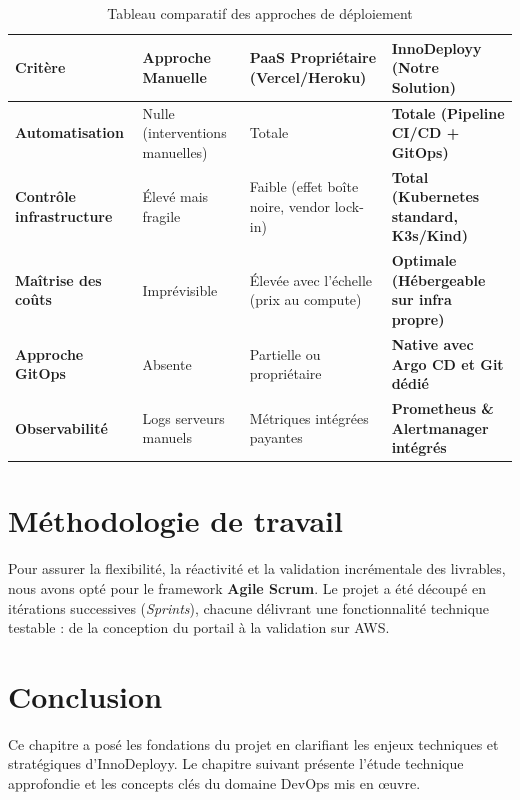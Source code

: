\documentclass[12pt,a4paper,oneside]{report}
\begin{document}
\begin{table}[H]
\centering
\small
\begin{tabularx}{\textwidth}{l X X X}
\toprule
\textbf{Critère} & \textbf{Approche Manuelle} & \textbf{PaaS Propriétaire (Vercel/Heroku)} & \textbf{InnoDeployy (Notre Solution)} \\
\midrule
\textbf{Automatisation} & Nulle (interventions manuelles) & Totale & \textbf{Totale (Pipeline CI/CD + GitOps)} \\
\textbf{Contrôle infrastructure} & Élevé mais fragile & Faible (effet boîte noire, vendor lock-in) & \textbf{Total (Kubernetes standard, K3s/Kind)} \\
\textbf{Maîtrise des coûts} & Imprévisible & Élevée avec l'échelle (prix au compute) & \textbf{Optimale (Hébergeable sur infra propre)} \\
\textbf{Approche GitOps} & Absente & Partielle ou propriétaire & \textbf{Native avec Argo CD et Git dédié} \\
\textbf{Observabilité} & Logs serveurs manuels & Métriques intégrées payantes & \textbf{Prometheus \& Alertmanager intégrés} \\
\bottomrule
\end{tabularx}
\caption{Tableau comparatif des approches de déploiement}
\end{table}

\section{Méthodologie de travail}
Pour assurer la flexibilité, la réactivité et la validation incrémentale des livrables, nous avons opté pour le framework \textbf{Agile Scrum}. Le projet a été découpé en itérations successives (\textit{Sprints}), chacune délivrant une fonctionnalité technique testable : de la conception du portail à la validation sur AWS.

\section{Conclusion}
Ce chapitre a posé les fondations du projet en clarifiant les enjeux techniques et stratégiques d'InnoDeployy. Le chapitre suivant présente l'étude technique approfondie et les concepts clés du domaine DevOps mis en œuvre.

\clearpage

\end{document}
